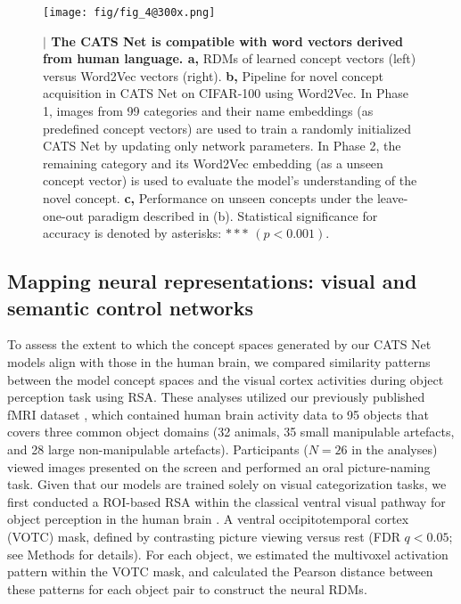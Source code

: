 \documentclass[pdflatex,sn-mathphys-num,lineno]{sn-jnl}%
\begin{document}
\begin{CJK}{UTF8}{gbsn}
\begin{figure}[h]
\centering
\texttt{[image: fig/fig\_4@300x.png]}
\caption{
\textbf{$\vert$ The CATS Net is compatible with word vectors derived from human language. a, }RDMs of learned concept vectors (left) versus Word2Vec vectors (right). 
\textbf{b,} Pipeline for novel concept acquisition in CATS Net on CIFAR-100 using Word2Vec. In Phase 1, images from 99 categories and their name embeddings (as predefined concept vectors) are used to train a randomly initialized CATS Net by updating only network parameters. In Phase 2, the remaining category and its Word2Vec embedding (as a unseen concept vector) is used to evaluate the model’s understanding of the novel concept. \textbf{c,} Performance on unseen concepts under the leave-one-out paradigm described in (b). Statistical significance for accuracy is denoted by asterisks: $***$ $(p < 0.001)$.}
\label{fig4}
\end{figure}

\subsection{Mapping neural representations: visual and semantic control networks}

To assess the extent to which the concept spaces generated by our CATS Net models align with those in the human brain, we compared similarity patterns between the model concept spaces and the visual cortex activities during object perception task using RSA. These analyses utilized our previously published fMRI dataset \cite{fu_different_2022}, which contained human brain activity data to 95 objects that covers three common object domains (32 animals, 35 small manipulable artefacts, and 28 large non-manipulable artefacts). Participants ($N=26$ in the analyses) viewed images presented on the screen and performed an oral picture-naming task. Given that our models are trained solely on visual categorization tasks, we first conducted a ROI-based RSA within the classical ventral visual pathway for object perception in the human brain \cite{ungerleider_what_1994}. A ventral occipitotemporal cortex (VOTC) mask, defined by contrasting picture viewing versus rest (FDR $q < 0.05$; see Methods for details). For each object, we estimated the multivoxel activation pattern within the VOTC mask, and calculated the Pearson distance between these patterns for each object pair to construct the neural RDMs. 


\end{CJK}
\end{document}
